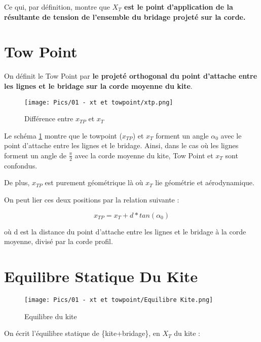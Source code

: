 Ce qui, par définition, montre que \textbf{$X_T$ est le point d'application de la résultante de tension de l'ensemble du bridage projeté sur la corde.}




\section{\textbf{Tow Point}} 
\label{sec:Ch1.2}

On définit le Tow Point par \textbf{le projeté orthogonal du point d'attache entre les lignes et le bridage sur la corde moyenne du kite}. 

\begin{figure}[H]
    \centering
    \texttt{[image: Pics/01 - xt et towpoint/xtp.png]}  
    \caption{Différence entre $x_{TP}$ et $x_T$}
    \label{fig:Xtp}
\end{figure}

Le schéma \ref{fig:Xtp} montre que le towpoint ($x_{TP}$) et $x_T$ forment un angle $\alpha_0$ avec le point d'attache entre les lignes et le bridage. Ainsi, dans le cas où les lignes forment un angle de $\frac{\pi}{2}$ avec la corde moyenne du kite, Tow Point et $x_T$ sont confondus. 

De plus, $x_{TP}$ est purement géométrique là où $x_T$ lie géométrie et aérodynamique.

On peut lier ces deux positions par la relation suivante : 

\begin{equation}
    x_{TP} = x_T + d * tan(\alpha_0)
    \label{eq:Xtp}
\end{equation}

où d est la distance du point d’attache entre les lignes et le bridage à la corde moyenne, divisé par la corde profil.

\section{\textbf{Equilibre Statique Du Kite}} 
\label{sec:Ch1.3}

\begin{figure}[H]
    \centering
    \texttt{[image: Pics/01 - xt et towpoint/Equilibre Kite.png]}  
    \caption{Equilibre du kite}
    \label{fig:Equilibre du kite}
\end{figure}

On écrit l'équilibre statique de \{kite+bridage\}, en $X_T$ du kite : 

